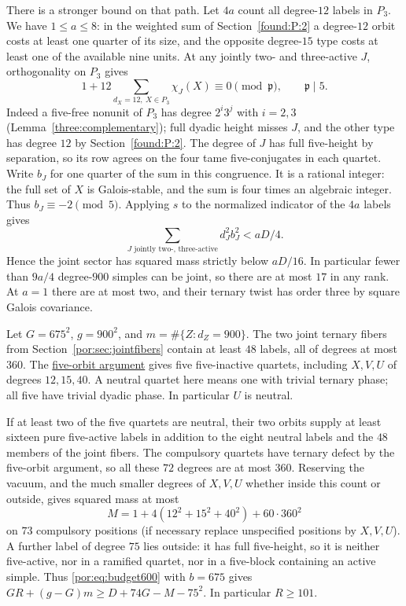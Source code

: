 \documentclass[11pt,a4paper]{article}
\numberwithin{equation}{section}
\theoremstyle{remark}
\begin{document}
There is a stronger bound on that path. Let $4a$ count all degree-$12$ labels in $P_3$. We have $1\le a\le8$: in the weighted sum of Section~\ref{found:P:2} a degree-$12$ orbit costs at least one quarter of its size, and the opposite degree-$15$ type costs at least one of the available nine units. At any jointly two- and three-active $J$, orthogonality on $P_3$ gives
\[
 1+12\sum_{d_X=12,\ X\in P_3}\chi_J(X)\equiv0\pmod{\mathfrak p},
 \qquad \mathfrak p\mid5.
\]
Indeed a five-free nonunit of $P_3$ has degree $2^i3^j$ with $i=2,3$ (Lemma~\ref{three:complementary}); full dyadic height misses $J$, and the other type has degree $12$ by Section~\ref{found:P:2}. The degree of $J$ has full five-height by separation, so its row agrees on the four tame five-conjugates in each quartet. Write $b_J$ for one quarter of the sum in this congruence. It is a rational integer: the full set of $X$ is Galois-stable, and the sum is four times an algebraic integer. Thus $b_J\equiv-2\pmod5$. Applying $s$ to the normalized indicator of the $4a$ labels gives
\[
          \sum_{J\text{ jointly two-, three-active}}d_J^2 b_J^2<aD/4.
\]
Hence the joint sector has squared mass strictly below $aD/16$. In particular fewer than $9a/4$ degree-$900$ simples can be joint, so there are at most $17$ in any rank. At $a=1$ there are at most two, and their ternary twist has order three by square Galois covariance.

Let $G=675^2$, $g=900^2$, and $m=\#\{Z:d_Z=900\}$. The two joint ternary fibers from Section~\ref{por:sec:jointfibers} contain at least $48$ labels, all of degrees at most $360$. The \hyperref[por:five-inactive-orbits]{five-orbit argument} gives five five-inactive quartets, including $X,V,U$ of degrees $12,15,40$. A neutral quartet here means one with trivial ternary phase; all five have trivial dyadic phase. In particular $U$ is neutral.

If at least two of the five quartets are neutral, their two orbits supply at least sixteen pure five-active labels in addition to the eight neutral labels and the $48$ members of the joint fibers. The compulsory quartets have ternary defect by the five-orbit argument, so all these $72$ degrees are at most $360$. Reserving the vacuum, and the much smaller degrees of $X,V,U$ whether inside this count or outside, gives squared mass at most
\[
 M=1+4(12^2+15^2+40^2)+60\cdot360^2
\]
on $73$ compulsory positions (if necessary replace unspecified positions by $X,V,U$). A further label of degree $75$ lies outside: it has full five-height, so it is neither five-active, nor in a ramified quartet, nor in a five-block containing an active simple. Thus \eqref{por:eq:budget600} with $b=675$ gives $GR+(g-G)m\ge D+74G-M-75^2$. In particular $R\ge101$.
\end{document}
